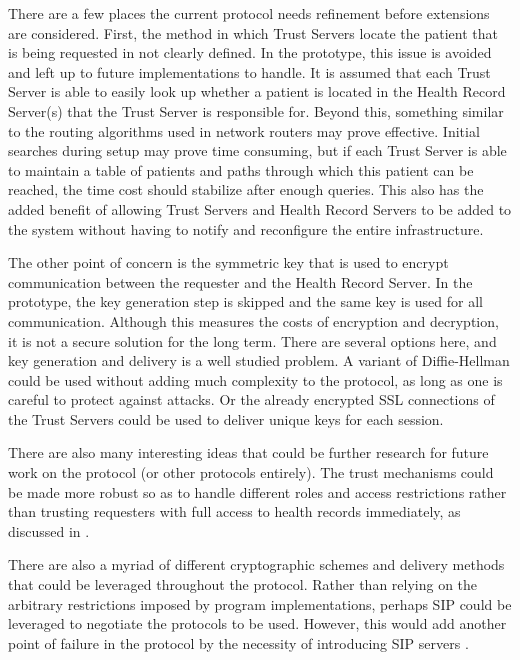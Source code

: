 There are a few places the current protocol needs refinement before extensions are considered. First, the method in which Trust Servers locate the patient that is being requested in not clearly defined. In the prototype, this issue is avoided and left up to future implementations to handle. It is assumed that each Trust Server is able to easily look up whether a patient is located in the Health Record Server(s) that the Trust Server is responsible for. Beyond this, something similar to the routing algorithms used in network routers may prove effective. Initial searches during setup may prove time consuming, but if each Trust Server is able to maintain a table of patients and paths through which this patient can be reached, the time cost should stabilize after enough queries. This also has the added benefit of allowing Trust Servers and Health Record Servers to be added to the system without having to notify and reconfigure the entire infrastructure.

The other point of concern is the symmetric key that is used to encrypt communication between the requester and the Health Record Server. In the prototype, the key generation step is skipped and the same key is used for all communication. Although this measures the costs of encryption and decryption, it is not a secure solution for the long term. There are several options here, and key generation and delivery is a well studied problem. A variant of Diffie-Hellman could be used without adding much complexity to the protocol, as long as one is careful to protect against attacks. Or the already encrypted SSL connections of the Trust Servers could be used to deliver unique keys for each session.

There are also many interesting ideas that could be further research for future work on the protocol (or other protocols entirely). The trust mechanisms could be made more robust so as to handle different roles and access restrictions rather than trusting requesters with full access to health records immediately, as discussed in \cite{6040529}.

There are also a myriad of different cryptographic schemes and delivery methods that could be leveraged throughout the protocol. Rather than relying on the arbitrary restrictions imposed by program implementations, perhaps SIP could be leveraged to negotiate the protocols to be used. However, this would add another point of failure in the protocol by the necessity of introducing SIP servers \cite{sparks2007sip}.